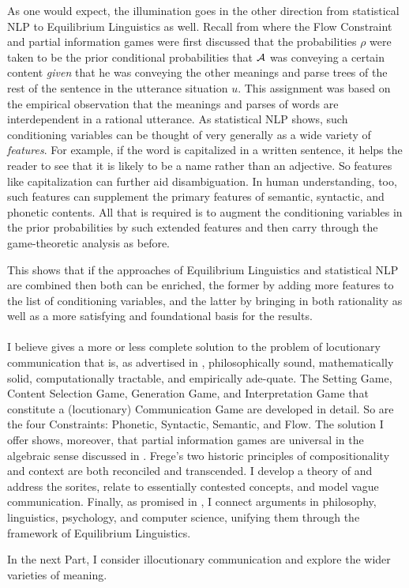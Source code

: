 As one would expect, the illumination goes in the other direction from statistical NLP to Equilibrium Linguistics as well. Recall from  where the Flow Constraint and partial information games were first discussed that the probabilities $\rho$ were taken to be the prior conditional probabilities that $\cal A$ was conveying a certain content \emph{given} that he was conveying the other meanings and parse trees of the rest of the sentence in the utterance situation $u$. This assignment was based on the empirical observation that the meanings and parses of words are interdependent in a rational utterance. As statistical NLP shows, such conditioning variables can be thought of very generally as a wide variety of \emph{features}. For example, if the word  is capitalized in a written sentence, it helps the reader to see that it is likely to be a name rather than an adjective. So features like capitalization can further aid disambiguation. In human understanding, too, such features can supplement the primary features of semantic, syntactic, and phonetic contents. All that is required is to augment the conditioning variables in the prior probabilities by such extended features and then carry through the game-theoretic analysis as before.

This shows that if the approaches of Equilibrium Linguistics and statistical NLP are combined then both can be enriched, the former by adding more features to the list of conditioning variables, and the latter by bringing in both rationality as well as a more satisfying and foundational basis for the results.\\\\
I believe  gives a more or less complete solution to the problem of locutionary communication that is, as advertised in , philosophically sound, mathematically solid, computationally tractable, and empirically ade-\linebreak quate. The Setting Game, Content Selection Game, Generation Game, and Interpretation Game that constitute a (locutionary) Communication Game are developed in detail. So are the four Constraints: Phonetic, Syntactic, Semantic, and Flow. The solution I offer shows, moreover, that partial information games are universal in the algebraic sense discussed in . Frege's two historic principles of compositionality and context are both reconciled and transcended. I develop a theory of  and address the sorites, relate  to essentially contested concepts, and model vague communication. Finally, as promised in , I connect arguments in philosophy, linguistics, psychology, and computer science, unifying them through the framework of Equilibrium Linguistics.

In the next Part, I consider illocutionary communication and explore the wider varieties of meaning.
